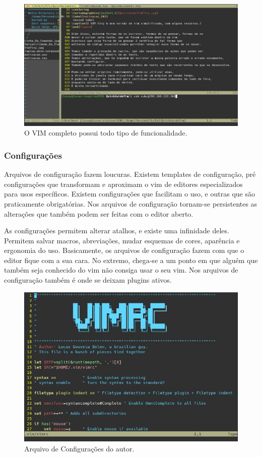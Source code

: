 \begin{figure}[!ht]
\centering
\includegraphics[scale=0.7]{motivacao/Versatilidade_Do_Vim.jpg}
\caption{O VIM completo possui todo tipo de funcionalidade.}
\end{figure}

\subsubsection{Configurações}
Arquivos de configuração fazem loucuras.
Existem templates de configuração, pré configurações que transformam
e aproximam o vim de editores especializados para usos específicos.
Existem configurações que facilitam o uso, e outras que são praticamente obrigatórias.
Nos arquivos de configuração tornam-se persistentes as alterações que também podem ser feitas com o editor aberto.

As configurações permitem alterar atalhos, e existe uma infinidade deles.
Permitem salvar macros, abreviações, mudar esquemas de cores, aparência e ergonomia do uso.
Basicamente, os arquivos de configuração fazem com que o editor fique com a sua cara.
No extremo, chega-se a um ponto em que alguém que também seja conhecido do vim não consiga usar o seu vim.
Nos arquivos de configuração também é onde se deixam plugins ativos.

\begin{figure}[!ht]
\centering
\includegraphics[scale=0.7]{motivacao/Arquivo_De_Configuracao.jpg}
\caption{Arquivo de Configurações do autor.}
\end{figure}

